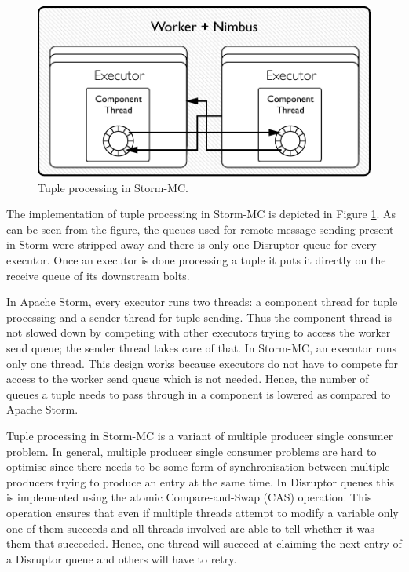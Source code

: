\documentclass[bsc,deptreport,twoside,singlespacing,normalheadings,parskip]{infthesis}\usepackage[]{graphicx}\usepackage[]{color}
\begin{document}
\begin{figure}[!htb]
	\centering
	\includegraphics[scale=0.7]{pdf/worker_inside_mc.pdf}
	\caption{Tuple processing in Storm-MC.}
	\label{fig:worker_inside_mc}
\end{figure}

The implementation of tuple processing in Storm-MC is depicted in Figure \ref{fig:worker_inside_mc}. As can be seen from the figure, the queues used for remote message sending present in Storm were stripped away and there is only one Disruptor queue for every executor. Once an executor is done processing a tuple it puts it directly on the receive queue of its downstream bolts.

In Apache Storm, every executor runs two threads: a component thread for tuple processing and a sender thread for tuple sending. Thus the component thread is not slowed down by competing with other executors trying to access the worker send queue; the sender thread takes care of that. In Storm-MC, an executor runs only one thread. This design works because executors do not have to compete for access to the worker send queue which is not needed. Hence, the number of queues a tuple needs to pass through in a component is lowered as compared to Apache Storm.

Tuple processing in Storm-MC is a variant of multiple producer single consumer problem. In general, multiple producer single consumer problems are hard to optimise since there needs to be some form of synchronisation between multiple producers trying to produce an entry at the same time. In Disruptor queues this is implemented using the atomic Compare-and-Swap (CAS) operation. This operation ensures that even if multiple threads attempt to modify a variable only one of them succeeds and all threads involved are able to tell whether it was them that succeeded. Hence, one thread will succeed at claiming the next entry of a Disruptor queue and others will have to retry.
\end{document}
